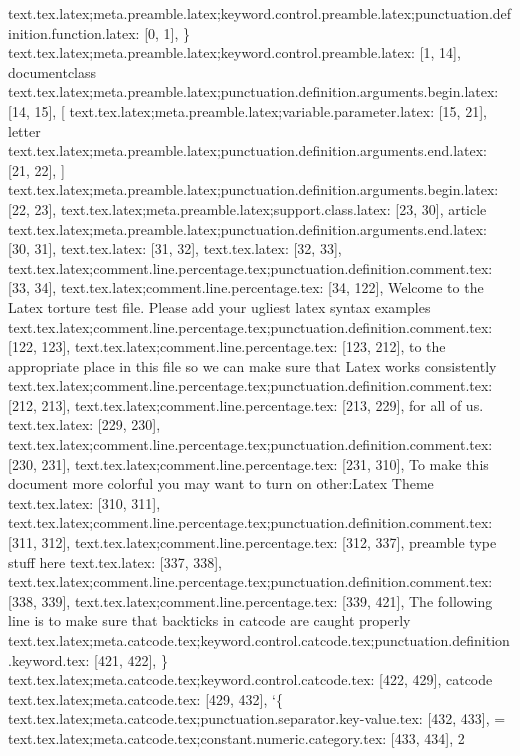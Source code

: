 text.tex.latex;meta.preamble.latex;keyword.control.preamble.latex;punctuation.definition.function.latex: [0, 1], {\}
text.tex.latex;meta.preamble.latex;keyword.control.preamble.latex: [1, 14], {documentclass}
text.tex.latex;meta.preamble.latex;punctuation.definition.arguments.begin.latex: [14, 15], {[}
text.tex.latex;meta.preamble.latex;variable.parameter.latex: [15, 21], {letter}
text.tex.latex;meta.preamble.latex;punctuation.definition.arguments.end.latex: [21, 22], {]}
text.tex.latex;meta.preamble.latex;punctuation.definition.arguments.begin.latex: [22, 23], {{}
text.tex.latex;meta.preamble.latex;support.class.latex: [23, 30], {article}
text.tex.latex;meta.preamble.latex;punctuation.definition.arguments.end.latex: [30, 31], {}}
text.tex.latex: [31, 32], {
}
text.tex.latex: [32, 33], {
}
text.tex.latex;comment.line.percentage.tex;punctuation.definition.comment.tex: [33, 34], {%
text.tex.latex;comment.line.percentage.tex: [34, 122], { Welcome to the Latex torture test file.  Please add your ugliest latex syntax examples
}
text.tex.latex;comment.line.percentage.tex;punctuation.definition.comment.tex: [122, 123], {%
text.tex.latex;comment.line.percentage.tex: [123, 212], { to the appropriate place in this file so we can make sure that Latex works consistently
}
text.tex.latex;comment.line.percentage.tex;punctuation.definition.comment.tex: [212, 213], {%
text.tex.latex;comment.line.percentage.tex: [213, 229], { for all of us.
}
text.tex.latex: [229, 230], {
}
text.tex.latex;comment.line.percentage.tex;punctuation.definition.comment.tex: [230, 231], {%
text.tex.latex;comment.line.percentage.tex: [231, 310], { To make this document more colorful you may want to turn on other:Latex Theme
}
text.tex.latex: [310, 311], {
}
text.tex.latex;comment.line.percentage.tex;punctuation.definition.comment.tex: [311, 312], {%
text.tex.latex;comment.line.percentage.tex: [312, 337], {preamble type stuff here
}
text.tex.latex: [337, 338], {
}
text.tex.latex;comment.line.percentage.tex;punctuation.definition.comment.tex: [338, 339], {%
text.tex.latex;comment.line.percentage.tex: [339, 421], { The following line is to make sure that backticks in catcode are caught properly
}
text.tex.latex;meta.catcode.tex;keyword.control.catcode.tex;punctuation.definition.keyword.tex: [421, 422], {\}
text.tex.latex;meta.catcode.tex;keyword.control.catcode.tex: [422, 429], {catcode}
text.tex.latex;meta.catcode.tex: [429, 432], {`\{}
text.tex.latex;meta.catcode.tex;punctuation.separator.key-value.tex: [432, 433], {=}
text.tex.latex;meta.catcode.tex;constant.numeric.category.tex: [433, 434], {2}
}}}}}}}}
